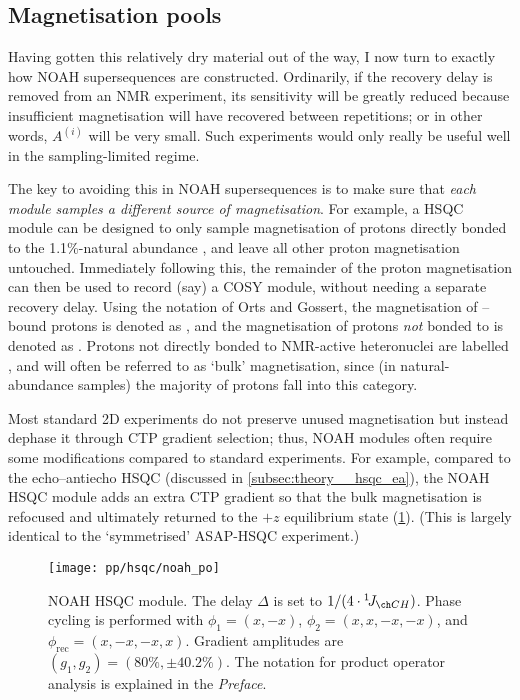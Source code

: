 \subsection{Magnetisation pools}
\label{subsec:noah__magpools}

Having gotten this relatively dry material out of the way, I now turn to exactly how NOAH supersequences are constructed.
Ordinarily, if the recovery delay is removed from an NMR experiment, its sensitivity will be greatly reduced because insufficient magnetisation will have recovered between repetitions; or in other words, $A^{(i)}$ will be very small.
Such experiments would only really be useful well in the sampling-limited regime.

The key to avoiding this in NOAH supersequences is to make sure that \textit{each module samples a different source of magnetisation}.
For example, a HSQC module can be designed to only sample magnetisation of protons directly bonded to the 1.1\%-natural abundance \carbon{}, and leave all other proton magnetisation untouched.
Immediately following this, the remainder of the proton magnetisation can then be used to record (say) a COSY module, without needing a separate recovery delay.
Using the notation of Orts and Gossert\autocite{Orts2018M}, the magnetisation of \carbon{}--bound protons is denoted as , and the magnetisation of protons \textit{not} bonded to \carbon{} is denoted as .
Protons not directly bonded to NMR-active heteronuclei are labelled , and will often be referred to as `bulk' magnetisation, since (in natural-abundance samples) the majority of protons fall into this category.

Most standard 2D experiments do not preserve unused magnetisation but instead dephase it through CTP gradient selection; thus, NOAH modules often require some modifications compared to standard experiments.
For example, compared to the echo--antiecho HSQC (discussed in \cref{subsec:theory__hsqc_ea}), the NOAH HSQC module\autocite{Kupce2017ACIE} adds an extra CTP gradient so that the bulk magnetisation is refocused and ultimately returned to the $+z$ equilibrium state (\cref{fig:noah_hsqc}).
(This is largely identical to the `symmetrised' ASAP-HSQC experiment\autocite{SchulzeSunninghausen2017JMR}.)

\begin{figure}[htb]
    \centering
    \texttt{[image: pp/hsqc/noah\_po]}%
    \caption[NOAH HSQC module with product operator analysis]{
        NOAH HSQC module.
        The delay $\Delta$ is set to $1 / (4 \cdot \oneJ{CH})$.
        Phase cycling is performed with $\phi_1 = (x, -x)$, $\phi_2 = (x, x, -x, -x)$, and $\phi_\text{rec} = (x, -x, -x, x)$.
        Gradient amplitudes are $(g_1, g_2) = (80\%, \pm 40.2\%)$.
        The notation for product operator analysis is explained in the \textit{Preface}.
    }
    \label{fig:noah_hsqc}
\end{figure}

